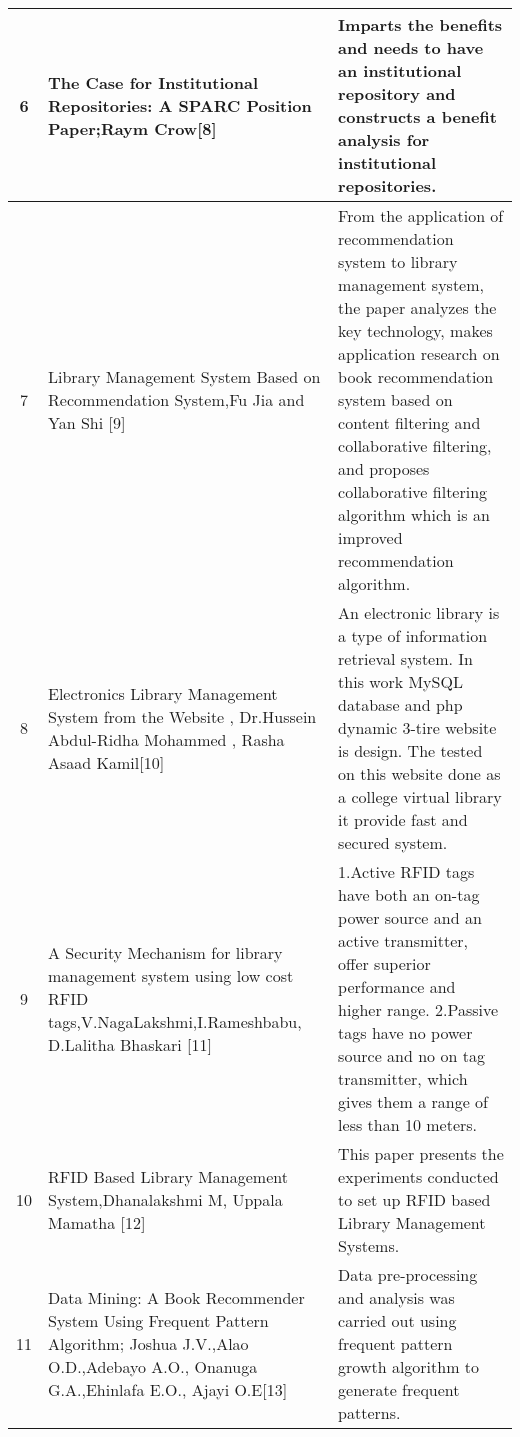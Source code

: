 \documentclass[a4paper,12pt]{report}
\begin{document}
\begin{table}[h!]
\begin{adjustbox}{max width=\textwidth}
\begin{tabular}{|c|p{8cm}|p{8cm}|}
         6 & The Case for Institutional Repositories: A SPARC Position Paper;Raym Crow[8]
        & Imparts the benefits and needs to have an institutional repository and constructs a benefit analysis for institutional repositories. \\
        \hline

        7 & Library Management System Based on Recommendation System,Fu Jia and Yan Shi [9]
        & From the application of recommendation system to library management system, the paper analyzes the key technology, makes application research on book recommendation system based on content filtering and collaborative filtering, and proposes collaborative filtering algorithm which is an improved recommendation algorithm. \\
        \hline

        8 & Electronics Library Management System from the Website , Dr.Hussein Abdul-Ridha Mohammed , Rasha Asaad Kamil[10]
        & An electronic library is a type of information retrieval system. In this work MySQL database and php dynamic 3-tire website is design. The tested on this website done as a college virtual library it provide fast and secured system.\\
        \hline

        9 & A Security Mechanism for library management system using low cost RFID tags,V.NagaLakshmi,I.Rameshbabu, D.Lalitha Bhaskari [11]
        & 1.Active RFID tags have both an on-tag power source and an active transmitter, offer superior performance and higher range.
        2.Passive tags have no power source and no on tag transmitter, which gives them a range of less than 10 meters.\\
        \hline
        
        10 & RFID Based Library Management System,Dhanalakshmi M, Uppala Mamatha [12]
        & This paper presents the experiments conducted to set up RFID based Library Management Systems.\\
        \hline

        11 & Data Mining: A Book Recommender System Using Frequent Pattern Algorithm; Joshua J.V.,Alao O.D.,Adebayo A.O., Onanuga G.A.,Ehinlafa E.O., Ajayi O.E[13]
        & Data pre-processing and analysis was carried out using frequent pattern growth algorithm to generate frequent patterns.\\
        \hline

        \end{tabular}
        \end{adjustbox}
    \end{table}
\end{document}
